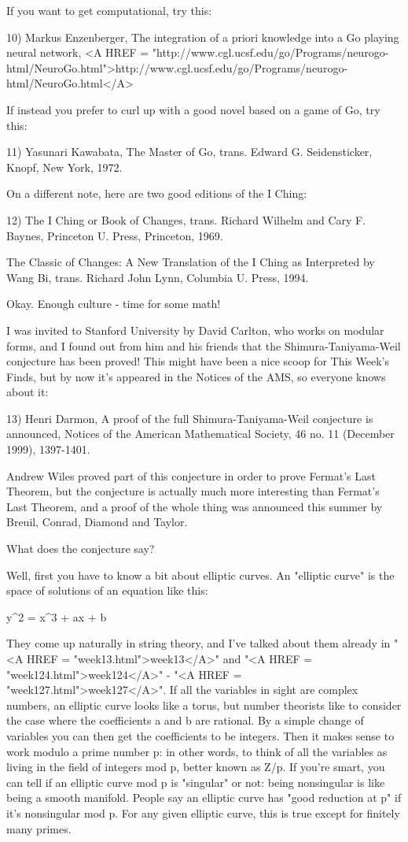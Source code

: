 If you want to get computational, try this:

10) Markus Enzenberger, The integration of a priori knowledge into
a Go playing neural network, 
<A HREF = "http://www.cgl.ucsf.edu/go/Programs/neurogo-html/NeuroGo.html">http://www.cgl.ucsf.edu/go/Programs/neurogo-html/NeuroGo.html</A>

If instead you prefer to curl up with a good novel based
on a game of Go, try this:

11) Yasunari Kawabata, The Master of Go, trans. Edward G. 
Seidensticker, Knopf, New York, 1972.  

On a different note, here are two good editions of the I Ching:

12) The I Ching or Book of Changes, trans. Richard Wilhelm and Cary F.
Baynes, Princeton U. Press, Princeton, 1969.

The Classic of Changes: A New Translation of the I Ching as Interpreted
by Wang Bi, trans. Richard John Lynn, Columbia U. Press, 1994.

Okay.  Enough culture - time for some math!

I was invited to Stanford University by David Carlton, who works on
modular forms, and I found out from him and his friends that the
Shimura-Taniyama-Weil conjecture has been proved!  This might have been
a nice scoop for This Week's Finds, but by now it's appeared in the
Notices of the AMS, so everyone knows about it:

13) Henri Darmon, A proof of the full Shimura-Taniyama-Weil conjecture
is announced, Notices of the American Mathematical Society, 46 no. 11
(December 1999), 1397-1401.

Andrew Wiles proved part of this conjecture in order to prove Fermat's
Last Theorem, but the conjecture is actually much more interesting than
Fermat's Last Theorem, and a proof of the whole thing was announced this
summer by Breuil, Conrad, Diamond and Taylor.  

What does the conjecture say?  

Well, first you have to know a bit about elliptic curves.  An 
"elliptic curve" is the space of solutions of an equation like 
this:

y^{2} = x^{3} + ax + b

They come up naturally in string theory, and I've talked about them
already in "<A HREF = "week13.html">week13</A>" and "<A
HREF = "week124.html">week124</A>" - "<A HREF =
"week127.html">week127</A>".  If all the variables in sight are
complex numbers, an elliptic curve looks like a torus, but number
theorists like to consider the case where the coefficients a and b are
rational.  By a simple change of variables you can then get the
coefficients to be integers.  Then it makes sense to work modulo a
prime number p: in other words, to think of all the variables as
living in the field of integers mod p, better known as Z/p.  If you're
smart, you can tell if an elliptic curve mod p is "singular"
or not: being nonsingular is like being a smooth manifold.  People say
an elliptic curve has "good reduction at p" if it's
nonsingular mod p.  For any given elliptic curve, this is true except
for finitely many primes.

